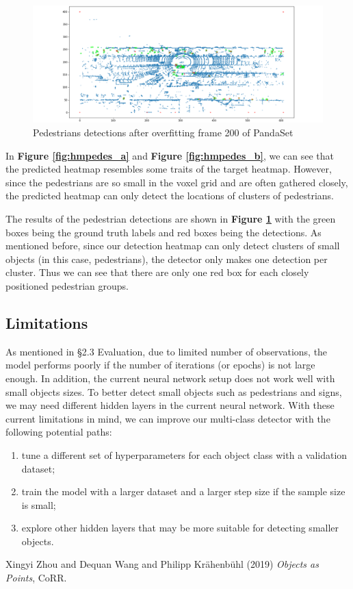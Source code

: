 \documentclass[letter]{article}
\newcommand{\fref}[1]{\textbf{Figure \ref{#1}}}
\begin{document}
	\begin{figure}[h]
		\centering
		\includegraphics[width=\linewidth]{images/det_overfit_pedes.png}
		\caption{Pedestrians detections after overfitting frame 200 of PandaSet}
		\label{fig:detpedes}
	\end{figure}

	In \fref{fig:hmpedes_a} and \fref{fig:hmpedes_b}, we can see that the predicted heatmap resembles some traits of the target heatmap. However, since the pedestrians are so small in the voxel grid and are often gathered closely, the predicted heatmap can only detect the locations of clusters of pedestrians. 

	The results of the pedestrian detections are shown in \fref{fig:detpedes} with the green boxes being the ground truth labels and red boxes being the detections. As mentioned before, since our detection heatmap can only detect clusters of small objects (in this case, pedestrians), the detector only makes one detection per cluster. Thus we can see that there are only one red box for each closely positioned pedestrian groups. 

	\subsection{Limitations}

	As mentioned in \S 2.3 Evaluation, due to limited number of observations, the model performs poorly if the number of iterations (or epochs) is not large enough. In addition, the current neural network setup does not work well with small objects sizes. To better detect small objects such as pedestrians and signs, we may need different hidden layers in the current neural network. With these current limitations in mind, we can improve our multi-class detector with the following potential paths: \begin{enumerate}
		\item tune a different set of hyperparameters for each object class with a validation dataset;
		\item train the model with a larger dataset and a larger step size if the sample size is small;
		\item explore other hidden layers that may be more suitable for detecting smaller objects. 
	\end{enumerate}
	
	\begin{thebibliography}{9}
		Xingyi Zhou and Dequan Wang and Philipp Kr{\"{a}}henb{\"{u}}hl (2019) \emph{Objects as Points}, CoRR.
	\end{thebibliography}
\end{document}
